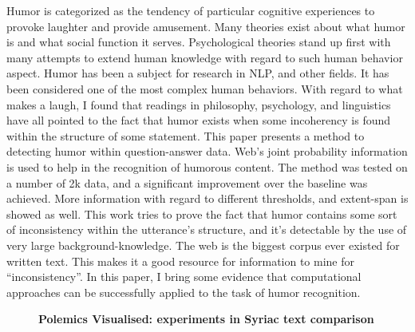 \documentclass[10pt, a4paper, twopage, headinclude, footinclude, BCOR5mm]{scrartcl}
\begin{document}
\noindent
Humor is categorized as the tendency of particular cognitive experiences to provoke laughter and provide amusement. Many theories exist about what humor is and what social function it serves. Psychological theories stand up first with many attempts to extend human knowledge with regard to such human behavior aspect. Humor has been a subject for research in NLP, and other fields. It has been considered one of the most complex human behaviors. With regard to what makes a laugh, I found that readings in philosophy, psychology, and linguistics have all pointed to the fact that humor exists when some incoherency is found within the structure of some statement.  This paper presents a method to detecting humor within question-answer data. Web's joint probability information is used to help in the recognition of humorous content. The method was tested on a number of 2k data, and a significant improvement over the baseline was achieved. More information with regard to different thresholds, and extent-span is showed as well. This work tries to prove the fact that humor contains some sort of inconsistency within the utterance's structure, and it's detectable by the use of very large background-knowledge. The web is the biggest corpus ever existed for written text. This makes it a good resource for information to mine for “inconsistency”. In this paper, I bring some evidence that computational approaches can be successfully applied to the task of humor recognition.


\newpage

\begin{figure}[t!]
\centering
\large\textbf{Polemics Visualised: experiments in Syriac text comparison }
\vspace*{0.5cm}
\end{figure}


        \begin{table}[t!]
    \end{table}
        \begin{table}[t!]
    \end{table}
\end{document}
